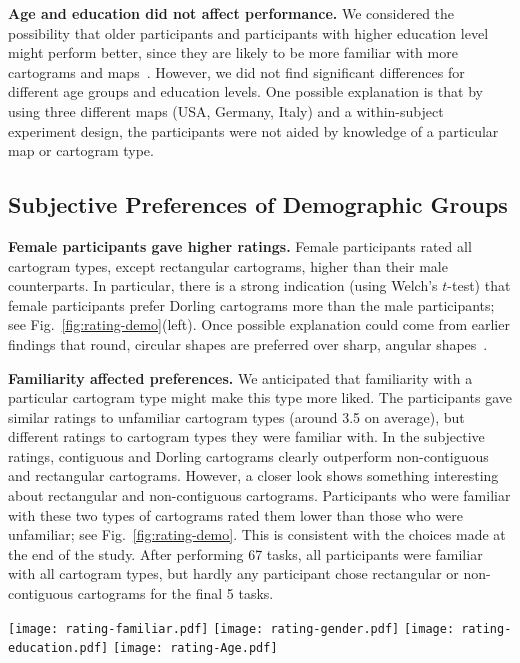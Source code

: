 \documentclass[10pt,journal,compsoc]{IEEEtran}
\begin{document}
\noindent
\textbf{Age and education did not affect performance.}
We considered the possibility that older participants and participants with higher education level might perform better, since they are likely to be more familiar with more cartograms and maps~\cite{monmonier2014lie}.
However, we did not find significant differences for different age groups and education levels. One possible explanation is that by using three different maps (USA, Germany, Italy) and a within-subject experiment design, the participants were not aided by knowledge of a particular map or cartogram type.




\subsection{Subjective Preferences of Demographic Groups}


 \textbf{Female participants gave higher ratings.} Female participants rated all cartogram types, except rectangular cartograms, higher than their male counterparts. In particular, there is a strong indication (using  Welch's $t$-test) that female participants prefer Dorling cartograms more than the male participants; see Fig.~\ref{fig:rating-demo}(left).  Once possible explanation could come from earlier findings that round, circular shapes are preferred over sharp, angular shapes~\cite{silvia2009people, bertamini2016observers}.

\noindent
\textbf{Familiarity affected preferences.}
We anticipated that familiarity with a particular cartogram type might make this type more liked.
The participants gave similar ratings to unfamiliar cartogram types (around 3.5 on average), but different ratings to cartogram types they were familiar with. In the subjective ratings, contiguous and Dorling cartograms clearly outperform non-contiguous and rectangular cartograms. However, a closer look shows something interesting about rectangular and non-contiguous cartograms. Participants who were familiar with these two types of cartograms rated them lower than those who were unfamiliar; see Fig.~\ref{fig:rating-demo}. This is consistent with the choices made at the end of the study. After performing 67 tasks, all participants were familiar with all cartogram types, but hardly any participant chose rectangular or non-contiguous cartograms for the final 5 tasks.


\begin{figure*}[htb]
\centering
\parbox{\textwidth}
{
\centering
\texttt{[image: rating-familiar.pdf]}
\texttt{[image: rating-gender.pdf]}
\texttt{[image: rating-education.pdf]}
\texttt{[image: rating-Age.pdf]}
}
\caption{Subjective ratings of different cartograms by participants familiar and not familiar with the cartogram type, by female and male participants, by participant with undergraduate and graduate education level, and by participants under and over the age of 25 years.}
\label{fig:rating-demo}
\end{figure*}
\end{document}
